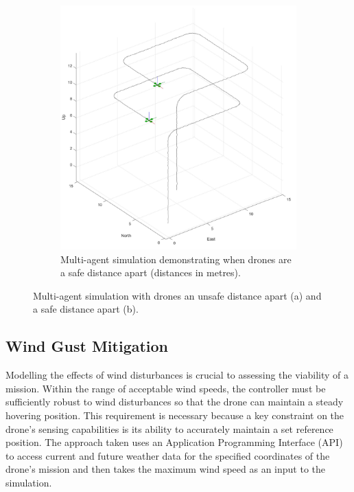 \begin{figure}[H]
\begin{subfigure}[b]{0.48\textwidth}
        \includegraphics[width=\textwidth]{figs/Samuel/Figures/MultiAgentExampleGreen (2).pdf}
        \caption{Multi-agent simulation demonstrating when drones are a safe distance apart (distances in metres).}
        \label{fig:1b}
    \end{subfigure}
    \caption[Multi-agent Simulation]{Multi-agent simulation with drones an unsafe distance apart (a) and a safe distance apart (b).}
    \label{fig:dronemulti}
\end{figure}



\subsection{Wind Gust Mitigation}
\label{gust}
Modelling the effects of wind disturbances is crucial to assessing the viability of a mission. Within the range of acceptable wind speeds, the controller must be sufficiently robust to wind disturbances so that the drone can maintain a steady hovering position. This requirement is necessary because a key constraint on the drone's sensing capabilities is its ability to accurately maintain a set reference position. The approach taken uses an Application Programming Interface (API) to access current and future weather data for the specified coordinates of the drone's mission and then takes the maximum wind speed as an input to the simulation. 

